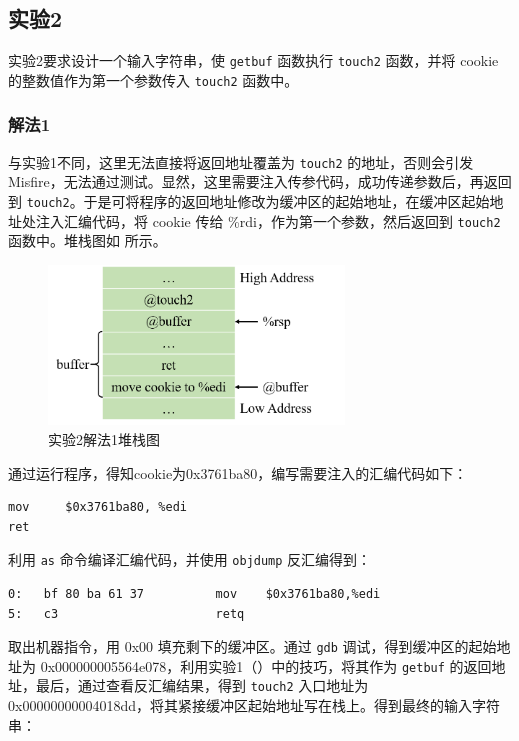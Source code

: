 \documentclass[12pt,a4paper]{article}
\begin{document}
\subsection{实验2}

实验2要求设计一个输入字符串，使 \verb|getbuf| 函数执行 \verb|touch2| 函数，并将 cookie 的整数值作为第一个参数传入 \verb|touch2| 函数中。

\subsubsection{解法1}

与实验1不同，这里无法直接将返回地址覆盖为 \verb|touch2| 的地址，否则会引发 Misfire，无法通过测试。显然，这里需要注入传参代码，成功传递参数后，再返回到 \verb|touch2|。于是可将程序的返回地址修改为缓冲区的起始地址，在缓冲区起始地址处注入汇编代码，将 cookie 传给 \%rdi，作为第一个参数，然后返回到 \verb|touch2| 函数中。堆栈图如  所示。

\begin{figure}[H]
    \hspace*{85pt}
    \includegraphics[width=0.7\textwidth]{./fig/2.png}
    \caption{实验2解法1堆栈图}
    \label{figure:exp_2}
\end{figure}

通过运行程序，得知cookie为0x3761ba80，编写需要注入的汇编代码如下：

\begin{lstlisting}[language={[x64]Assembler}]
mov     $0x3761ba80, %edi
ret
\end{lstlisting}

利用 \verb|as| 命令编译汇编代码，并使用 \verb|objdump| 反汇编得到：

\begin{lstlisting}[language={[x64]Assembler}]
0:   bf 80 ba 61 37          mov    $0x3761ba80,%edi
5:   c3                      retq
\end{lstlisting}

取出机器指令，用 0x00 填充剩下的缓冲区。通过 \verb|gdb| 调试，得到缓冲区的起始地址为 0x000000005564e078，利用实验1（）中的技巧，将其作为 \verb|getbuf| 的返回地址，最后，通过查看反汇编结果，得到 \verb|touch2| 入口地址为 0x00000000004018dd，将其紧接缓冲区起始地址写在栈上。得到最终的输入字符串：
\end{document}
